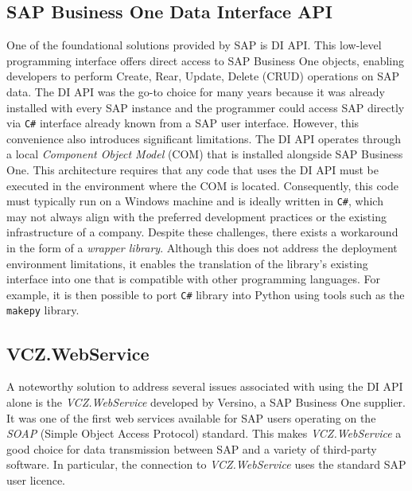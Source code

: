 \subsection{SAP Business One Data Interface API}
\label{subsec:sap-b1-di-api}

One of the foundational solutions provided by SAP is \ac{DI API}.
This low-level programming interface offers direct access to SAP Business One objects, enabling developers to perform Create, Rear, Update, Delete (\ac{CRUD}) operations on SAP data. 
The \ac{DI API} was the go-to choice for many years because it was already installed with every SAP instance and the programmer could access SAP directly via \texttt{C\#} interface already known from a SAP user interface.
However, this convenience also introduces significant limitations.
The \ac{DI API} operates through a local \textit{Component Object Model} (COM) that is installed alongside SAP Business One.
This architecture requires that any code that uses the DI API must be executed in the environment where the COM is located.
Consequently, this code must typically run on a Windows machine and is ideally written in \texttt{C\#}, which may not always align with the preferred development practices or the existing infrastructure of a company.
Despite these challenges, there exists a workaround in the form of a \textit{wrapper library}.
Although this does not address the deployment environment limitations, it enables the translation of the library's existing interface into one that is compatible with other programming languages.
For example, it is then possible to port \texttt{C\#} library into Python using tools such as the \texttt{makepy} library.


\subsection{VCZ.WebService}
A noteworthy solution to address several issues associated with using the \ac{DI API} alone  is the \textit{VCZ.WebService} developed by Versino, a SAP Business One supplier. 
It was one of the first web services available for SAP users operating on the \textit{SOAP} (Simple Object Access Protocol) standard. 
This makes \textit{VCZ.WebService} a good choice for data transmission between SAP and a variety of third-party software.
In particular, the connection to \textit{VCZ.WebService} uses the standard SAP user licence.

